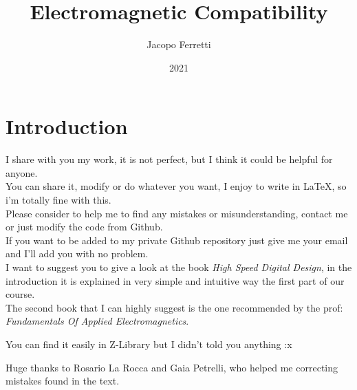 \documentclass{article}
\title{Electromagnetic Compatibility}
\date{2021}
\author{Jacopo Ferretti}
\numberwithin{equation}{section}
\numberwithin{figure}{section}
\begin{document}
\clearpage\maketitle
\thispagestyle{empty}
\begin{center}
  \Huge{}
\end{center}
\newpage
{}
\tableofcontents
\newpage
\section*{Introduction}
I share with you my work, it is not perfect, but I think it could be helpful for anyone.\\
You can share it, modify or do whatever you want, I enjoy to write in \LaTeX, so i'm totally fine with this.\\
Please consider to help me to find any mistakes or misunderstanding, contact me or just modify the code from Github.\\
If you want to be added to my private Github repository just give me your email and I'll add you with no problem.\\
I want to suggest you to give a look at the book \emph{High Speed Digital Design}\cite{zhang_book}, in the introduction it is explained in very simple and intuitive way the first part of our course.\\
The second book that I can highly suggest is the one recommended by the prof: \emph{Fundamentals Of Applied Electromagnetics}\cite{found_of_applied_magnetism}.\begin{footnotesize}
You can find it easily in Z-Library but I didn't told you anything :x
\end{footnotesize}

\vspace*{\fill}
Huge thanks to Rosario La Rocca and Gaia Petrelli, who helped me correcting mistakes found in the text.
\newpage













\medskip


\end{document}
